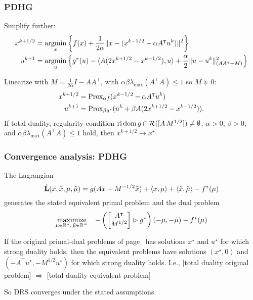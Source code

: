 \documentclass[10pt,mathserif]{beamer}
\begin{document}
 \begin{frame}
  \frametitle{PDHG}
Simplify further:
\begin{align*}
    x^{k+1/2}&=\operatorname*{argmin}_{x}\left\{    f(x)+\frac{1}{2\alpha}\|x-(x^{k-1/2}-\alpha A^\intercal u ^{k})\|^2    \right\}\\
     u ^{k+1}&=\operatorname*{argmin}_{ u }\left\{
    g^*( u )-\langle A(2x^{k+1/2}-x^{k-1/2}), u \rangle
    +\frac{\alpha}{2}\| u - u ^k\|^2_{(AA^\intercal+M)}
    \right\}
\end{align*}
\vspace{0.2in}

Linearize with $M=\frac{1}{\beta\alpha}I-AA^\intercal$, with $\alpha\beta\lambda_\mathrm{max}(A^\intercal A)\le 1$ so $M\succeq 0$:
\begin{align*}
    x^{k+1/2}&=\mathrm{Prox}_{\alpha f}(x^{k-1/2}-\alpha A^\intercal u ^{k})\\
     u ^{k+1}&=\mathrm{Prox}_{\beta g^*}( u ^k+\beta A(2x^{k+1/2}-x^{k-1/2})).
\end{align*}
If total duality, regularity condition $\mathrm{ri}\,\mathrm{dom}\, g\cap\mathcal{R}([A\,M^{1/2}])\ne \emptyset$,
$\alpha>0$, $\beta>0$, and $\alpha\beta\lambda_\mathrm{max}(A^\intercal A)\le 1$ hold, then $x^{k+1/2}\rightarrow x^\star$.
 \end{frame}

 \begin{frame}
\frametitle{Convergence analysis: PDHG}
The Lagrangian
\[
\tilde{\mathbf{L}}(x,\tilde{x},\mu,\tilde{\mu})=
g(Ax+M^{-1/2}\tilde{x})
+\langle x,\mu\rangle
+\langle \tilde{x},\tilde{\mu}\rangle
-f^*(\mu)
\]
generates the stated equivalent primal problem
and the dual problem
\[
\begin{array}{ll}
\underset{\mu\in \mathbb{R}^n,\,\tilde{\mu}\in \mathbb{R}^{m}}{\mbox{maximize}}&
-\left(
\begin{bmatrix}
A^\intercal\\M^{1/2}
\end{bmatrix}
\rhd
g^*\right)(-\mu,-\tilde{\mu})
-f^*(\mu)
\end{array}
\]

\vspace{0.2in}
If the original primal-dual problems of page~\pageref{frame_pdhg1} has solutions $x^\star$ and $ u ^\star$ for which strong duality holds,
then the equivalent problems have solutions $(x^\star,0)$ and
$(-A^\intercal u ^\star,-M^{1/2} u ^\star)$ for which strong duality holds.
I.e., [total duality original problem] $\Rightarrow$ [total duality equivalent problem]

\vspace{0.2in}
So DRS converges under the stated assumptions.
 \end{frame}
\end{document}
